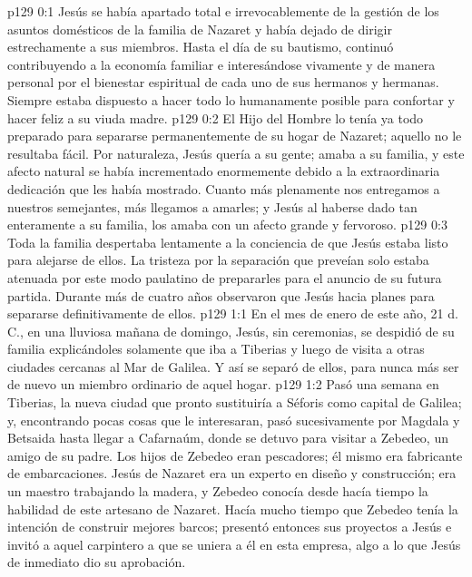 \author{Comisión de seres intermedios}
\vs p129 0:1 Jesús se había apartado total e irrevocablemente de la gestión de los asuntos domésticos de la familia de Nazaret y había dejado de dirigir estrechamente a sus miembros. Hasta el día de su bautismo, continuó contribuyendo a la economía familiar e interesándose vivamente y de manera personal por el bienestar espiritual de cada uno de sus hermanos y hermanas. Siempre estaba dispuesto a hacer todo lo humanamente posible para confortar y hacer feliz a su viuda madre.
\vs p129 0:2 El Hijo del Hombre lo tenía ya todo preparado para separarse permanentemente de su hogar de Nazaret; aquello no le resultaba fácil. Por naturaleza, Jesús quería a su gente; amaba a su familia, y este afecto natural se había incrementado enormemente debido a la extraordinaria dedicación que les había mostrado. Cuanto más plenamente nos entregamos a nuestros semejantes, más llegamos a amarles; y Jesús al haberse dado tan enteramente a su familia, los amaba con un afecto grande y fervoroso.
\vs p129 0:3 Toda la familia despertaba lentamente a la conciencia de que Jesús estaba listo para alejarse de ellos. La tristeza por la separación que preveían solo estaba atenuada por este modo paulatino de prepararles para el anuncio de su futura partida. Durante más de cuatro años observaron que Jesús hacia planes para separarse definitivamente de ellos.
\vs p129 1:1 En el mes de enero de este año, 21 d. C., en una lluviosa mañana de domingo, Jesús, sin ceremonias, se despidió de su familia explicándoles solamente que iba a Tiberias y luego de visita a otras ciudades cercanas al Mar de Galilea. Y así se separó de ellos, para nunca más ser de nuevo un miembro ordinario de aquel hogar.
\vs p129 1:2 Pasó una semana en Tiberias, la nueva ciudad que pronto sustituiría a Séforis como capital de Galilea; y, encontrando pocas cosas que le interesaran, pasó sucesivamente por Magdala y Betsaida hasta llegar a Cafarnaúm, donde se detuvo para visitar a Zebedeo, un amigo de su padre. Los hijos de Zebedeo eran pescadores; él mismo era fabricante de embarcaciones. Jesús de Nazaret era un experto en diseño y construcción; era un maestro trabajando la madera, y Zebedeo conocía desde hacía tiempo la habilidad de este artesano de Nazaret. Hacía mucho tiempo que Zebedeo tenía la intención de construir mejores barcos; presentó entonces sus proyectos a Jesús e invitó a aquel carpintero a que se uniera a él en esta empresa, algo a lo que Jesús de inmediato dio su aprobación.
